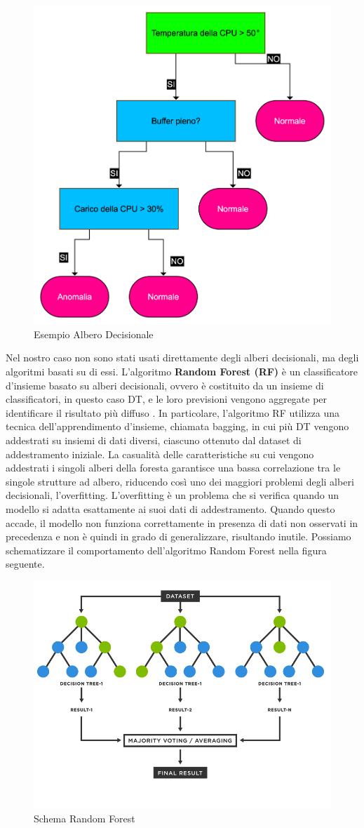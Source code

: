 \begin{figure}[H]
    \centering
    \includegraphics[width=0.6\linewidth]{Esempio DT.png}
    \caption{Esempio Albero Decisionale}
    \label{fig:enter-label}
\end{figure}

\vspace{1cm}

Nel nostro caso non sono stati usati direttamente degli alberi decisionali, ma degli algoritmi basati su di essi. L'algoritmo \textbf{Random Forest (RF)} \`e un classificatore d'insieme basato su alberi decisionali, ovvero \`e costituito da un insieme di classificatori, in questo caso DT, e le loro previsioni vengono aggregate per identificare il risultato pi\`u diffuso \cite{rf}.
In particolare, l'algoritmo RF utilizza una tecnica dell'apprendimento d'insieme, chiamata bagging, in cui pi\`u DT vengono addestrati su insiemi di dati diversi, ciascuno ottenuto dal dataset di addestramento iniziale. La casualit\`a delle caratteristiche su cui vengono addestrati i singoli alberi della foresta garantisce una bassa correlazione tra le singole strutture ad albero, riducendo cos\`i uno dei maggiori problemi degli alberi decisionali, l'overfitting. 
L'overfitting \`e un problema che si verifica quando un modello si adatta esattamente ai suoi dati di addestramento. Quando questo accade, il modello non funziona correttamente in presenza di dati non osservati in precedenza e non \`e quindi in grado di generalizzare, risultando inutile.
Possiamo schematizzare il comportamento dell'algoritmo Random Forest nella figura seguente.

\begin{figure}[H]
    \centering
    \includegraphics[width=0.6\linewidth]{RF Diagramma.png}
    \caption{Schema Random Forest}
    \label{fig:enter-label}
\end{figure}

